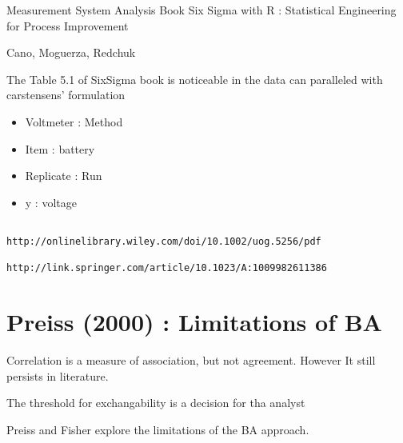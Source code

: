\documentclass[MAIN.tex]{subfiles}
\begin{document}

Measurement System Analysis 
Book Six Sigma with R : Statistical Engineering for Process Improvement

Cano, Moguerza, Redchuk


The Table 5.1 of SixSigma book is noticeable in the data can paralleled with carstensens' formulation

\begin{itemize}
	\item Voltmeter : Method 
	\item Item : battery
	\item Replicate : Run
	\item y : voltage
\end{itemize}



	\begin{verbatim}

http://onlinelibrary.wiley.com/doi/10.1002/uog.5256/pdf

http://link.springer.com/article/10.1023/A:1009982611386	
	\end{verbatim}

	
%

\section*{Preiss (2000) : Limitations of BA }

Correlation is a measure of association, but not agreement. However It still persists in literature.

The threshold for exchangability is a decision for tha analyst

Preiss and Fisher explore the limitations of the BA approach.
\end{document}
